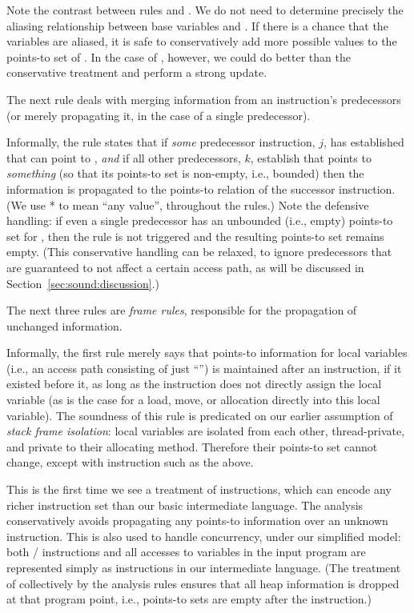 Note the contrast between rules  and . We do not need to determine precisely the aliasing relationship between base variables  and . If there is a chance that the variables are aliased, it is safe to conservatively add more possible values to the points-to set of . In the case of , however, we could do better than the conservative treatment and perform a strong update.


The next rule deals with merging information from an instruction's predecessors (or merely propagating it, in the case of a single predecessor).

Informally, the rule states that if \emph{some} predecessor instruction, $j$, has established that  can point to , \emph{and} if all other predecessors, $k$, establish that  points to \emph{something} (so that its points-to set is non-empty, i.e., bounded) then the information is propagated to the points-to relation of the successor instruction. (We use * to mean ``any value'', throughout the rules.) Note the defensive handling: if even a single predecessor has an unbounded (i.e., empty) points-to set for , then the rule is not triggered and the resulting points-to set remains empty. (This conservative handling can be relaxed, to ignore predecessors that are guaranteed to not affect a certain access path, as will be discussed in Section~\ref{sec:sound:discussion}.)


The next three rules are \emph{frame rules}, responsible for the propagation of unchanged information.  

Informally, the first rule merely says that points-to information for local variables (i.e., an access path consisting of just ``'') is maintained after an instruction, if it existed before it, as long as the instruction does not directly assign the local variable (as is the case for a load, move, or allocation directly into this local variable). The soundness of this rule is predicated on our earlier assumption of \emph{stack frame isolation}: local variables are isolated from each other, thread-private, and private to their allocating method. Therefore their points-to set cannot change, except with instruction such as the above.

This is the first time we see a treatment of \unknown{} instructions, which can encode any richer instruction set than our basic intermediate language. The analysis conservatively avoids propagating any points-to information over an unknown instruction. This is also used to handle concurrency, under our simplified model: both / instructions and all accesses to  variables in the input program are represented simply as \unknown{} instructions in our intermediate language. (The treatment of \unknown{} collectively by the analysis rules ensures that all heap information is dropped at that program point, i.e., points-to sets are empty after the instruction.)

